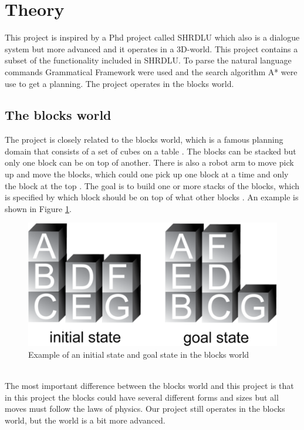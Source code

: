 \section{Theory}
This project is inspired by a Phd project called SHRDLU which also is a dialogue system but more advanced and it operates in a 3D-world. This project contains a subset of the functionality included in SHRDLU. To parse the natural language commands Grammatical Framework were used and the search algorithm A* were use to get a planning. The project operates in the blocks world.

\subsection{The blocks world}
The project is closely related to the blocks world, which is a famous planning domain that consists of a set of cubes on a table \citep{blocksworld_ai}. The blocks can be stacked but only one block can be on top of another. There is also a robot arm to move pick up and move the blocks, which could one pick up one block at a time and only the block at the top \citep{blocksworld_ai}. The goal is to build one or more stacks of the blocks, which is specified by which block should be on top of what other blocks \citep{blocksworld_ai}. An example is shown in Figure \ref{fig:blocksworld}.
\begin{figure}[h!]
\centering
\includegraphics[scale = 0.4]{fig/blocksworld.png}
\caption{Example of an initial state and goal state in the blocks world \citep{blocksworld_fig}}
\label{fig:blocksworld}
\end{figure}\\
The most important difference between the blocks world and this project is that in this project the blocks could have several different forms and sizes but all moves must follow the laws of physics. Our project still operates in the blocks world, but the world is a bit more advanced. 

